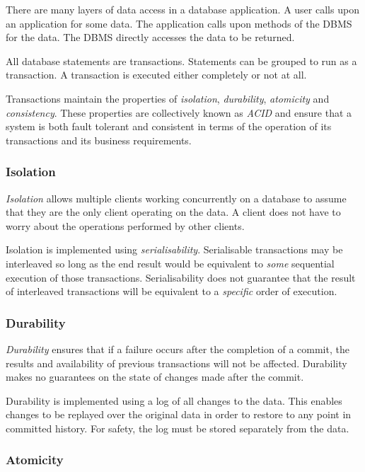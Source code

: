 There are many layers of data access in a database application.
A user calls upon an application for some data.
The application calls upon methods of the DBMS for the data.
The DBMS directly accesses the data to be returned.

All database statements are transactions.
Statements can be grouped to run as a transaction.
A transaction is executed either completely or not at all.

Transactions maintain the properties of \emph{isolation}, \emph{durability}, \emph{atomicity} and \emph{consistency}.
These properties are collectively known as \emph{ACID} and ensure that a system is both fault tolerant and consistent in terms of the operation of its transactions and its business requirements.

\subsubsection{Isolation}

\emph{Isolation} allows multiple clients working concurrently on a database to assume that they are the only client operating on the data.
A client does not have to worry about the operations performed by other clients.

Isolation is implemented using \emph{serialisability}.
Serialisable transactions may be interleaved so long as the end result would be equivalent to \emph{some} sequential execution of those transactions.
Serialisability does not guarantee that the result of interleaved transactions will be equivalent to a \emph{specific} order of execution.

\subsubsection{Durability}

\emph{Durability} ensures that if a failure occurs after the completion of a commit, the results and availability of previous transactions will not be affected.
Durability makes no guarantees on the state of changes made after the commit.

Durability is implemented using a log of all changes to the data.
This enables changes to be replayed over the original data in order to restore to any point in committed history.
For safety, the log must be stored separately from the data.

\subsubsection{Atomicity}

